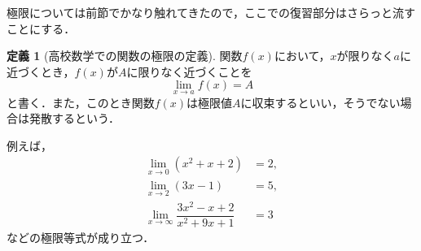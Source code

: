 \documentclass[a4paper,12pt,autodetect-engine,dvipdfmx]{jsarticle}
\theoremstyle{definition}
\newtheorem{dfn}{定義}[section]
\begin{document}
極限については前節でかなり触れてきたので，ここでの復習部分はさらっと流すことにする．
\begin{dfn}[高校数学での関数の極限の定義]
    関数$f(x)$において，$x$が限りなく$a$に近づくとき，$f(x)$が$A$に限りなく近づくことを
    $$\lim_{x \to a}f(x) = A$$
    と書く．また，このとき関数$f(x)$は極限値$A$に収束するといい，そうでない場合は発散するという．
\end{dfn}
例えば，
\begin{align*}
    \lim_{x \to 0}(x^2 + x + 2) &= 2,\\
    \lim_{x \to 2}(3x - 1) &= 5,\\
    \lim_{x \to \infty}\dfrac{3x^2 -x +2}{x^2 + 9x + 1} &= 3
\end{align*}
などの極限等式が成り立つ．








\end{document}

